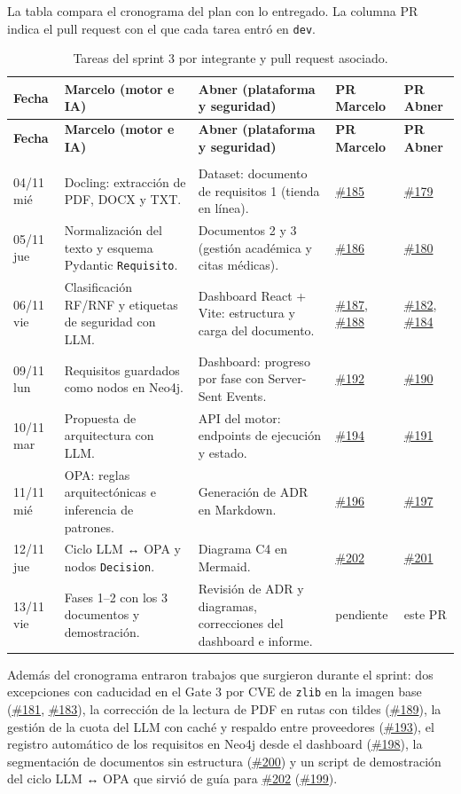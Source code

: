 \documentclass[11pt,a4paper]{report}
\newcommand{\pr}[1]{\href{https://github.com/PracticasESPE/Framework_Desarrollo_Seguro/pull/#1}{\##1}}
\newcommand{\filasprint}[1]{\rowcolor{azulclaro}\multicolumn{5}{l}{\bfseries #1}\\}
\begin{document}
La tabla compara el cronograma del plan con lo entregado. La columna PR indica el pull request con
el que cada tarea entró en \texttt{dev}.

{\small
\begin{longtable}{@{}P{1.55cm}P{4.6cm}P{4.6cm}P{1.6cm}P{1.6cm}@{}}
\caption{Tareas del sprint 3 por integrante y pull request asociado.}\\
\toprule
\textbf{Fecha} & \textbf{Marcelo (motor e IA)} & \textbf{Abner (plataforma y seguridad)} & \textbf{PR Marcelo} & \textbf{PR Abner}\\
\midrule
\endfirsthead
\toprule
\textbf{Fecha} & \textbf{Marcelo (motor e IA)} & \textbf{Abner (plataforma y seguridad)} & \textbf{PR Marcelo} & \textbf{PR Abner}\\
\midrule
\endhead
\filasprint{Sprint 3: fases 1 y 2}
04/11 mié & Docling: extracción de PDF, DOCX y TXT. & Dataset: documento de requisitos 1 (tienda en línea). & \pr{185} & \pr{179}\\
05/11 jue & Normalización del texto y esquema Pydantic \texttt{Requisito}. & Documentos 2 y 3 (gestión académica y citas médicas). & \pr{186} & \pr{180}\\
06/11 vie & Clasificación RF/RNF y etiquetas de seguridad con LLM. & Dashboard React + Vite: estructura y carga del documento. & \pr{187}, \pr{188} & \pr{182}, \pr{184}\\
09/11 lun & Requisitos guardados como nodos en Neo4j. & Dashboard: progreso por fase con Server-Sent Events. & \pr{192} & \pr{190}\\
10/11 mar & Propuesta de arquitectura con LLM. & API del motor: endpoints de ejecución y estado. & \pr{194} & \pr{191}\\
11/11 mié & OPA: reglas arquitectónicas e inferencia de patrones. & Generación de ADR en Markdown. & \pr{196} & \pr{197}\\
12/11 jue & Ciclo LLM ↔ OPA y nodos \texttt{Decision}. & Diagrama C4 en Mermaid. & \pr{202} & \pr{201}\\
13/11 vie & Fases 1--2 con los 3 documentos y demostración. & Revisión de ADR y diagramas, correcciones del dashboard e informe. & pendiente & este PR\\
\bottomrule
\end{longtable}}

Además del cronograma entraron trabajos que surgieron durante el sprint: dos excepciones con
caducidad en el Gate 3 por CVE de \texttt{zlib} en la imagen base (\pr{181}, \pr{183}), la
corrección de la lectura de PDF en rutas con tildes (\pr{189}), la gestión de la cuota del LLM con
caché y respaldo entre proveedores (\pr{193}), el registro automático de los requisitos en Neo4j
desde el dashboard (\pr{198}), la segmentación de documentos sin estructura (\pr{200}) y un script
de demostración del ciclo LLM ↔ OPA que sirvió de guía para \pr{202} (\pr{199}).
\end{document}
